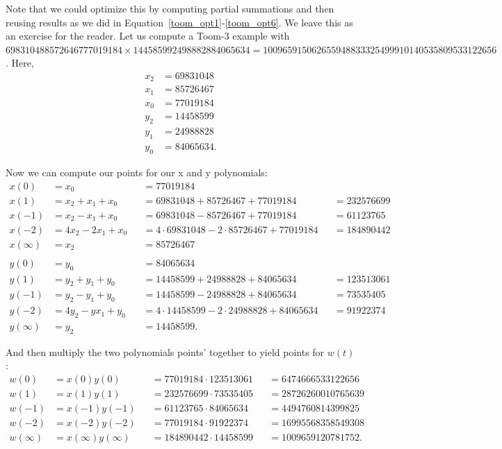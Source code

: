 \documentclass[psamsfonts,reqno]{amsart}
\theoremstyle{definition}
\theoremstyle{remark}
\numberwithin{equation}{section}
\begin{document}
Note that we could optimize this by computing partial summations and then reusing results as we did in Equation~\ref{toom_opt1}-\ref{toom_opt6}. We leave this as an exercise for the reader. Let us compute a Toom-3 example with $\num{698310488572646777019184} \times \num{144585992498882884065634} = 
\num{100965915062655948833325499910140535809533122656}$. Here,
\begin{align*}
	x_2 &= \num{69831048} \\
	x_1 &= \num{85726467} \\
	x_0 &= \num{77019184} \\
	y_2 &= \num{14458599} \\
	y_1 &= \num{24988828} \\
	y_0 &= \num{84065634}.
\end{align*}

Now we can compute our points for our x and y polynomials:
\begin{align*}
	x(0) &= x_0 &&= \num{77019184} \\
	x(1) &= x_2 + x_1 + x_0 &&= \num{69831048} + \num{85726467} + \num{77019184} &&= \num{232576699} \\
	x(-1) &= x_2 - x_1 + x_0 &&= \num{69831048} - \num{85726467} + \num{77019184} &&= \num{61123765} \\
	x(-2) &= 4x_2 - 2x_1 + x_0 &&= 4 \cdot \num{69831048} - 2 \cdot \num{85726467} + \num{77019184} &&= \num{184890442} \\
	x(\infty) &= x_2 &&= \num{85726467} \\ \\
	y(0) &= y_0 &&= \num{84065634} \\
	y(1) &= y_2 + y_1 + y_0 &&= \num{14458599} + \num{24988828} + \num{84065634} &&= \num{123513061} \\
	y(-1) &= y_2 - y_1 + y_0 &&= \num{14458599} - \num{24988828} + \num{84065634} &&= \num{73535405} \\
	y(-2) &= 4y_2 - yx_1 + y_0 &&= 4 \cdot \num{14458599} - 2 \cdot \num{24988828} + \num{84065634} &&= \num{91922374} \\
	y(\infty) &= y_2 &&= \num{14458599}.
\end{align*}

And then multiply the two polynomials points' together to yield points for $w(t)$:
\begin{align*}
	w(0) &= x(0)y(0) &&= \num{77019184} \cdot \num{123513061} &&= \num{6474666533122656}\\
	w(1) &= x(1)y(1) &&= \num{232576699} \cdot \num{73535405} &&= \num{28726260010765639} \\
	w(-1) &= x(-1)y(-1) &&= \num{61123765} \cdot \num{84065634}  &&= \num{4494760814399825} \\
	w(-2) &= x(-2)y(-2) &&= \num{77019184} \cdot \num{91922374} &&= \num{16995568358549308} \\
	w(\infty) &= x(\infty)y(\infty) &&= \num{184890442} \cdot \num{14458599} &&= \num{1009659120781752}.
\end{align*}
\end{document}

